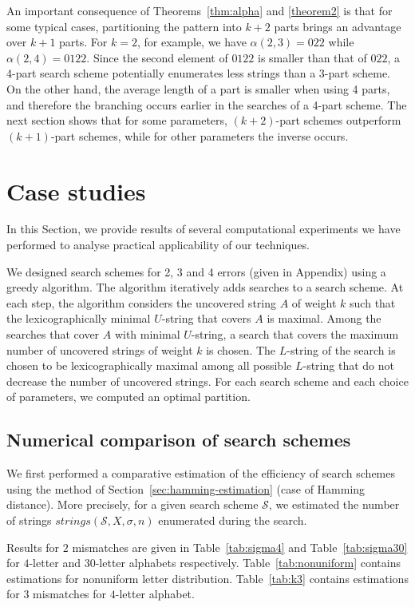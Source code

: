 \documentclass[12pt]{article}
\newcommand{\scheme}{\mathcal{S}}
\newcommand{\partition}{X}
\newcommand{\numstrings}{\mathit{strings}}
\begin{document}
An important consequence of Theorems~\ref{thm:alpha} and
\ref{theorem2} is that for some typical cases, partitioning the pattern
into $k+2$ parts brings an advantage over $k+1$ parts. 
For $k=2$, for example, we have $\alpha(2,3)=022$ while $\alpha(2,4)=0122$.
Since the second element of $0122$ is smaller than that
of $022$, a 4-part search scheme potentially enumerates
less strings than a 3-part scheme.
On the other hand, the average length of a part is smaller when using 4 parts,
and therefore the branching occurs earlier in the searches of a 4-part scheme.
The next section shows that for some parameters, $(k+2)$-part schemes
outperform $(k+1)$-part schemes,
while for other parameters the inverse occurs.

\section{Case studies}\label{sec:experiments}
In this Section, we provide results of several computational
experiments we have performed to analyse practical applicability
of our techniques. 

We designed search schemes for 2, 3 and 4 errors (given in Appendix) using a
greedy algorithm. The algorithm iteratively adds searches to a search
scheme. 
At each step, the algorithm considers the uncovered string $A$ of weight $k$
such that the lexicographically minimal $U$-string that covers $A$
is maximal.
Among the searches that cover $A$ with minimal $U$-string, a search that
covers the maximum number of uncovered strings of weight $k$ is chosen.
The $L$-string of the search is chosen to be lexicographically maximal among
all possible $L$-string that do not decrease the number of uncovered strings.
For each search scheme and each choice of parameters, we computed an
optimal partition. 

\subsection{Numerical comparison of search schemes}
\label{subsec:experimenttheor}
We first performed a comparative estimation of the efficiency of
search schemes using the method of Section~\ref{sec:hamming-estimation}
(case of Hamming distance). More precisely, for a given search scheme $\scheme$,
we estimated the number of strings
$\numstrings(\scheme,\partition,\sigma,n)$ enumerated during the search. 

Results for $2$ mismatches are given in Table~\ref{tab:sigma4} and
Table~\ref{tab:sigma30} for $4$-letter and $30$-letter alphabets
respectively.
Table~\ref{tab:nonuniform} contains estimations for nonuniform letter
distribution.
Table~\ref{tab:k3} contains estimations for $3$
mismatches for $4$-letter alphabet.
\end{document}
